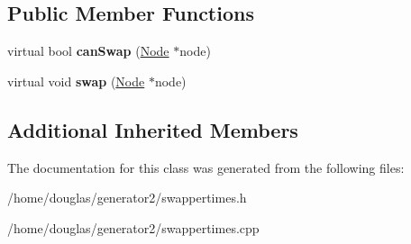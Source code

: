 \subsection*{Public Member Functions}
\begin{DoxyCompactItemize}
\item 
virtual bool {\bfseries can\+Swap} (\hyperlink{classNode}{Node} $\ast$node)\hypertarget{classSwapperTimes_a58ef0e5a1df11303f6292ac0a5e5f548}{}\label{classSwapperTimes_a58ef0e5a1df11303f6292ac0a5e5f548}

\item 
virtual void {\bfseries swap} (\hyperlink{classNode}{Node} $\ast$node)\hypertarget{classSwapperTimes_ab9e3aa678acdfccd5e00cd16cc6eec0d}{}\label{classSwapperTimes_ab9e3aa678acdfccd5e00cd16cc6eec0d}

\end{DoxyCompactItemize}
\subsection*{Additional Inherited Members}


The documentation for this class was generated from the following files\+:\begin{DoxyCompactItemize}
\item 
/home/douglas/generator2/swappertimes.\+h\item 
/home/douglas/generator2/swappertimes.\+cpp\end{DoxyCompactItemize}

